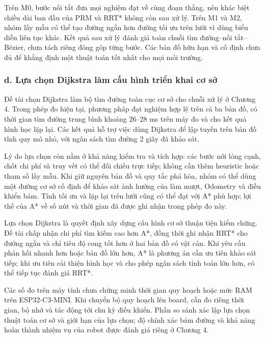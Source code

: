 \documentclass[12pt,a4paper,oneside]{report}
\begin{document}
Trên M0, bước nối tắt đưa mọi nghiệm đạt về cùng đoạn thẳng, nên khác biệt chiều dài ban đầu của PRM và RRT* không còn sau xử lý. Trên M1 và M2, nhóm lấy mẫu có thể tạo đường ngắn hơn đường tối ưu trên lưới vì dùng biểu diễn liên tục khác. Kết quả sau xử lý đánh giá toàn chuỗi tìm đường--nối tắt--Bézier, chưa tách riêng đóng góp từng bước. Các bản đồ hữu hạn và cố định chưa đủ để khẳng định một thuật toán tốt nhất cho mọi môi trường.

\subsubsection*{d. Lựa chọn Dijkstra làm cấu hình triển khai cơ sở}

Đề tài chọn Dijkstra làm bộ tìm đường toàn cục cơ sở cho chuỗi xử lý ở Chương 4. Trong phép đo hiện tại, phương pháp đạt nghiệm hợp lệ trên cả ba bản đồ, có thời gian tìm đường trung bình khoảng 26--28 ms trên máy đo và cho kết quả hình học lặp lại. Các kết quả hỗ trợ việc dùng Dijkstra để lập tuyến trên bản đồ tĩnh quy mô nhỏ, với ngân sách tìm đường 2 giây đã khảo sát.

Lý do lựa chọn còn nằm ở khả năng kiểm tra và tích hợp: các bước nới lỏng cạnh, chốt chi phí và truy vết có thể đối chiếu trực tiếp; không cần thêm heuristic hoặc tham số lấy mẫu. Khi giữ nguyên bản đồ và quy tắc phá hòa, nhóm có thể dùng một đường cơ sở cố định để khảo sát ảnh hưởng của làm mượt, Odometry và điều khiển bám. Tính tối ưu và lặp lại trên lưới cũng có thể đạt với A* phù hợp; lợi thế của A* về số nút và thời gian đã được ghi nhận trong phép đo này.

Lựa chọn Dijkstra là quyết định xây dựng cấu hình cơ sở thuận tiện kiểm chứng. Đề tài chấp nhận chi phí tìm kiếm cao hơn A*, đồng thời ghi nhận RRT* cho đường ngắn và chỉ tiêu độ cong tốt hơn ở hai bản đồ có vật cản. Khi yêu cầu phản hồi nhanh hơn hoặc bản đồ lớn hơn, A* là phương án cần ưu tiên khảo sát tiếp; khi ưu tiên cải thiện hình học và cho phép ngân sách tính toán lớn hơn, có thể tiếp tục đánh giá RRT*.

Các số đo trên máy tính chưa chứng minh thời gian quy hoạch hoặc mức RAM trên ESP32-C3-MINI. Khi chuyển bộ quy hoạch lên board, cần đo riêng thời gian, bộ nhớ và tác động tới chu kỳ điều khiển. Phần so sánh xác lập lựa chọn thuật toán cơ sở và giới hạn của lựa chọn; độ chính xác bám đường và khả năng hoàn thành nhiệm vụ của robot được đánh giá riêng ở Chương 4.

\setmonofont{Consolas}
\end{document}
